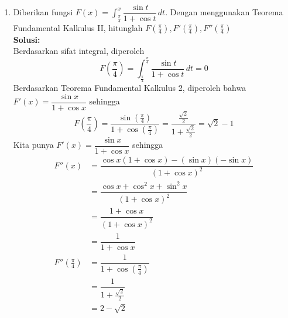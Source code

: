 \documentclass{article}
\begin{document}
\begin{enumerate}
\newpage
	\item Diberikan fungsi $\displaystyle F(x)=\int^x_{\frac{\pi}{4}} \dfrac{\sin t}{1+\cos t} \, dt$. Dengan menggunakan Teorema Fundamental Kalkulus II, hitunglah $F\left(\frac{\pi}{4}\right), F'\left(\frac{\pi}{4}\right),F''\left(\frac{\pi}{4}\right)$
	\\[0.1 cm]
	\textbf{Solusi:}\\
	Berdasarkan sifat integral, diperoleh $$ F\left(\dfrac{\pi}{4}\right) = \int^{\frac{\pi}{4}}_{\frac{\pi}{4}} \frac{\sin t}{1+\cos t} \, dt = 0 $$
	Berdasarkan Teorema Fundamental Kalkulus 2, diperoleh bahwa $F'(x)=\dfrac{\sin x}{1+\cos x}$ sehingga 
	$$  F\left(\dfrac{\pi}{4}\right) = \dfrac{\sin\left(\frac{\pi}{4}\right)}{1+\cos\left(\frac{\pi}{4}\right)} = \dfrac{\frac{\sqrt{2}}{2}}{1+\frac{\sqrt{2}}{2}} = \sqrt{2}-1 $$
	Kita punya $F'(x)=\dfrac{\sin x}{1+\cos x}$ sehingga 
	\begin{align*}
	F''(x) &= \dfrac{\cos x (1+\cos x)-(\sin x)(-\sin x)}{(1+\cos x)^2} \\
	&= \dfrac{\cos x+\cos^2x+\sin^2x}{(1+\cos x)^2}\\
	&= \dfrac{1+\cos x}{(1+\cos x)^2} \\
	&= \dfrac{1}{1+\cos x}\\
	F''\left(\frac{\pi}{4}\right)&=\dfrac{1}{1+\cos\left(\frac{\pi}{4}\right)}\\ 
	&=\dfrac{1}{1+\frac{\sqrt{2}}{2}}\\
	&= 2-\sqrt{2} 
	\end{align*}
\end{enumerate}
\newpage
\end{document}

